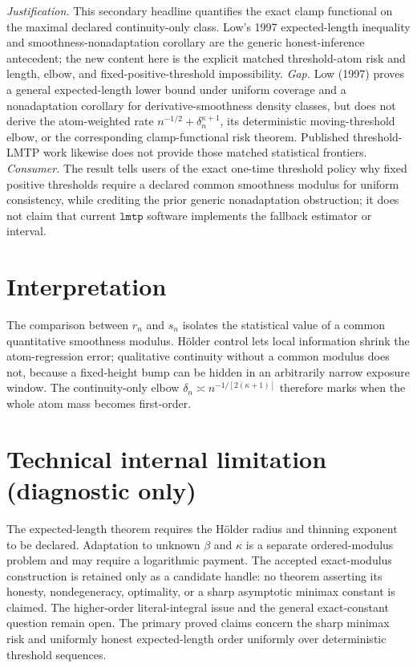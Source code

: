 \documentclass{article}
\begin{document}
\par\smallskip\noindent \textit{Justification.} This secondary headline quantifies the exact clamp functional on the maximal declared continuity-only class. Low's 1997 expected-length inequality and smoothness-nonadaptation corollary are the generic honest-inference antecedent; the new content here is the explicit matched threshold-atom risk and length, elbow, and fixed-positive-threshold impossibility. \textit{Gap.} Low (1997) proves a general expected-length lower bound under uniform coverage and a nonadaptation corollary for derivative-smoothness density classes, but does not derive the atom-weighted rate \(n^{-1/2}+\delta_n^{\kappa+1}\), its deterministic moving-threshold elbow, or the corresponding clamp-functional risk theorem. Published threshold-LMTP work likewise does not provide those matched statistical frontiers. \textit{Consumer.} The result tells users of the exact one-time threshold policy why fixed positive thresholds require a declared common smoothness modulus for uniform consistency, while crediting the prior generic nonadaptation obstruction; it does not claim that current \(\texttt{lmtp}\) software implements the fallback estimator or interval.

\section{Interpretation}

The comparison between \(r_n\) and \(s_n\) isolates the statistical value of a common quantitative smoothness modulus.  Hölder control lets local information shrink the atom-regression error; qualitative continuity without a common modulus does not, because a fixed-height bump can be hidden in an arbitrarily narrow exposure window.  The continuity-only elbow \(\delta_n\asymp n^{-1/[2(\kappa+1)]}\) therefore marks when the whole atom mass becomes first-order.

\section*{Technical internal limitation (diagnostic only)}

The expected-length theorem requires the Hölder radius and thinning exponent to be declared. Adaptation to unknown \(\beta\) and \(\kappa\) is a separate ordered-modulus problem and may require a logarithmic payment. The accepted exact-modulus construction is retained only as a candidate handle: no theorem asserting its honesty, nondegeneracy, optimality, or a sharp asymptotic minimax constant is claimed. The higher-order literal-integral issue and the general exact-constant question remain open. The primary proved claims concern the sharp minimax risk and uniformly honest expected-length order uniformly over deterministic threshold sequences.
\end{document}
